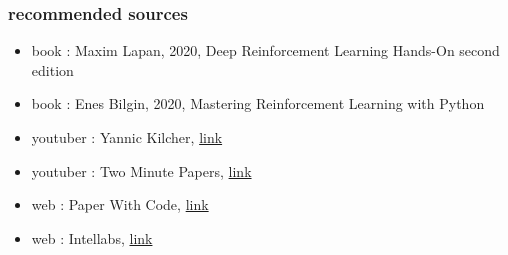 \documentclass{beamer}
\begin{document}
\begin{frame}
  
  \frametitle{recommended sources}

  \begin{itemize}
    \item book : Maxim Lapan, 2020, Deep Reinforcement Learning Hands-On second edition
    \item book : Enes Bilgin, 2020, Mastering Reinforcement Learning with Python
    \item youtuber : Yannic Kilcher, \href{https://www.youtube.com/c/YannicKilcher/videos}{link}
    \item youtuber : Two Minute Papers, \href{https://www.youtube.com/c/KárolyZsolnai/videos}{link}
    \item web : Paper With Code, \href{https://paperswithcode.com/methods/category/policy-gradient-methods}{link}
    \item web : Intellabs, \href{https://intellabs.github.io/coach/components/agents/index.html}{link}
  \end{itemize}
    
\end{frame}
\end{document}
